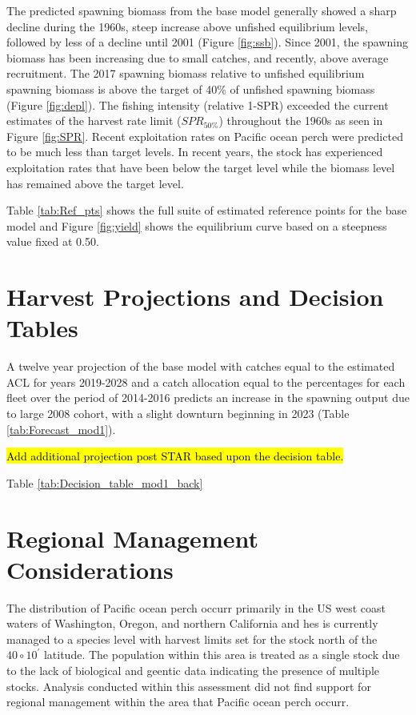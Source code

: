 \documentclass[12pt,]{article}
\begin{document}
The predicted spawning biomass from the base model generally showed a
sharp decline during the 1960s, steep increase above unfished
equilibrium levels, followed by less of a decline until 2001 (Figure
\ref{fig:ssb}). Since 2001, the spawning biomass has been increasing due
to small catches, and recently, above average recruitment. The 2017
spawning biomass relative to unfished equilibrium spawning biomass is
above the target of 40\% of unfished spawning biomass (Figure
\ref{fig:depl}). The fishing intensity (relative 1-SPR) exceeded the
current estimates of the harvest rate limit (\(SPR_{50\%}\)) throughout
the 1960s as seen in Figure \ref{fig:SPR}. Recent exploitation rates on
Pacific ocean perch were predicted to be much less than target levels.
In recent years, the stock has experienced exploitation rates that have
been below the target level while the biomass level has remained above
the target level.

Table \ref{tab:Ref_pts} shows the full suite of estimated reference
points for the base model and Figure \ref{fig:yield} shows the
equilibrium curve based on a steepness value fixed at 0.50.

\section{Harvest Projections and Decision
Tables}\label{harvest-projections-and-decision-tables}

A twelve year projection of the base model with catches equal to the
estimated ACL for years 2019-2028 and a catch allocation equal to the
percentages for each fleet over the period of 2014-2016 predicts an
increase in the spawning output due to large 2008 cohort, with a slight
downturn beginning in 2023 (Table \ref{tab:Forecast_mod1}).

\hl{Add additional projection post STAR based upon the decision table.}

Table \ref{tab:Decision_table_mod1_back}

\section{Regional Management
Considerations}\label{regional-management-considerations}

The distribution of Pacific ocean perch occurr primarily in the US west
coast waters of Washington, Oregon, and northern California and hes is
currently managed to a species level with harvest limits set for the
stock north of the \(40\circ 10^\prime\) latitude. The population within
this area is treated as a single stock due to the lack of biological and
geentic data indicating the presence of multiple stocks. Analysis
conducted within this assessment did not find support for regional
management within the area that Pacific ocean perch occurr.
\end{document}

